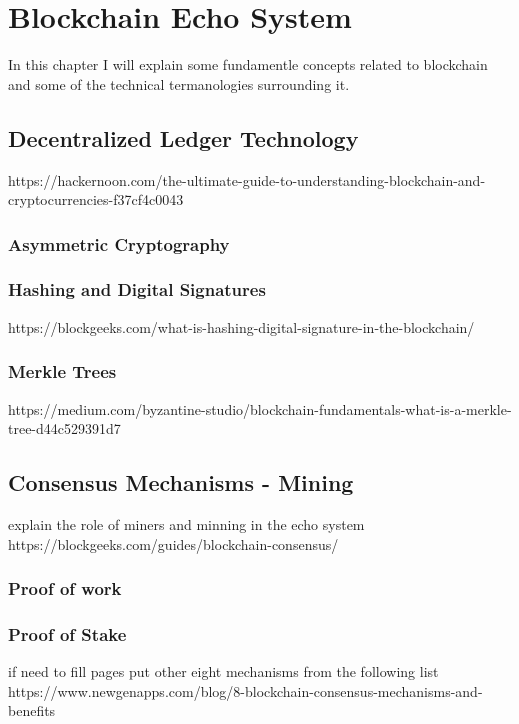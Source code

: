 \section{Blockchain Echo System} \label{Blockchain}
In this chapter I will explain some fundamentle concepts related to blockchain and some of the technical termanologies surrounding it.
\subsection{Decentralized Ledger Technology}
https://hackernoon.com/the-ultimate-guide-to-understanding-blockchain-and-cryptocurrencies-f37cf4c0043
\subsubsection{Asymmetric Cryptography}
\subsubsection{Hashing and Digital Signatures}
https://blockgeeks.com/what-is-hashing-digital-signature-in-the-blockchain/
\subsubsection{Merkle Trees}
https://medium.com/byzantine-studio/blockchain-fundamentals-what-is-a-merkle-tree-d44c529391d7
\subsection{Consensus Mechanisms - Mining}
explain the role of miners and minning in the echo system
https://blockgeeks.com/guides/blockchain-consensus/
\subsubsection{Proof of work}
\subsubsection{Proof of Stake}
if need to fill pages put other eight mechanisms from the following list
https://www.newgenapps.com/blog/8-blockchain-consensus-mechanisms-and-benefits

